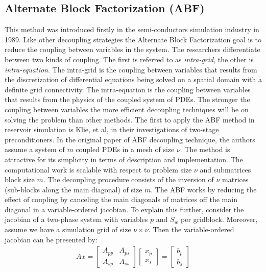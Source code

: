 \subsection{Alternate Block Factorization (ABF)}
This method was introduced firstly in the semi-conductors simulation industry in 1989\supercite{Bank1989}. Like other decoupling strategies the
Alternate Block Factorization goal is to reduce the coupling between variables in the system. The researchers differentiate between two kinds
of coupling. The first is referred to as \textit{intra-grid}, the other is \textit{intra-equation}. The intra-grid is the coupling between 
variables that results from the discretization of differential equations being solved on a spatial domain with a definite grid connectivity.
The intra-equation is the coupling between variables that results from the physics of the coupled system of PDEs.
The stronger the coupling between variables the more efficient decoupling techniques will be on solving the problem than other methods.
The first to apply the ABF method in reservoir simulation is Klie, et al\supercite{klie}, in their investigations of two-stage preconditioners. 
In the original paper of ABF decoupling technique, the authors assume a system of $m$ coupled PDEs in a mesh of size $\nu$.
The method is attractive for its simplicity in terms of description and implementation. The computational work is scalable with respect to 
problem size $\nu$ and submatrices block size $m$. The decoupling procedure consists of the inversion of $\nu$ matrices (sub-blocks along the main diagonal) of size $m$. 
The ABF works by reducing the effect of coupling by canceling the main diagonals of matrices off the main diagonal in a variable-ordered jacobian.
To explain this further, consider the jacobian of a two-phase system with variables $p$ and $S_{w}$ per gridblock. Moreover, assume we have a simulation grid of size $\nu\times\nu$.
Then the variable-ordered jacobian can be presented by:
\begin{align}
	Ax = 
\begin{bmatrix}
	A_{pp} & A_{ps}\\
	A_{sp} & A_{ss}
\end{bmatrix}
\begin{bmatrix}
	x_{p} \\
	x_{s}
\end{bmatrix}
=
\begin{bmatrix}
	b_{p} \\
	b_{s}
\end{bmatrix}
\end{align}
